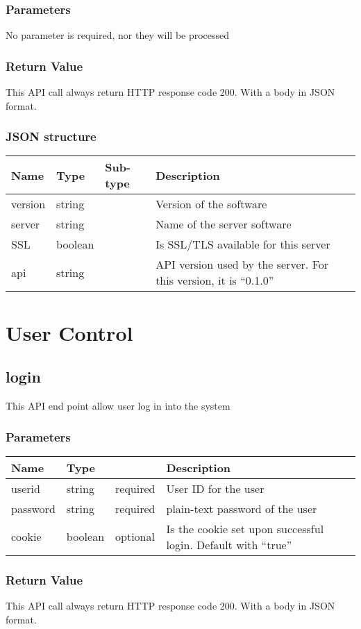 \documentclass[a4paper,12pt]{report}
\begin{document}
	\subsection{Parameters}
	No parameter is required, nor they will be processed
	\subsection{Return Value}
	This API call always return HTTP response code 200. With a body in JSON format.
	\subsection{JSON structure}
	\begin{tabular}{|l|l|l|p{10cm}|}
		\hline
		Name & Type & Sub-type & Description\\\hline
		version & string & & Version of the software\\\hline
		server & string & & Name of the server software\\\hline
		SSL & boolean & & Is SSL/TLS available for this server\\\hline
		api & string & & API version used by the server. For this version, it is ``0.1.0''\\\hline
	\end{tabular}
	\chapter{User Control}
	\section{login}
	This API end point allow user log in into the system
	\subsection{Parameters}
	\begin{tabular}{|l|ll|p{10cm}|}
		\hline
		Name & Type & & Description\\\hline
		userid & string & required & User ID for the user\\\hline
		password & string & required & plain-text password of the user\\\hline
		cookie & boolean & optional & 	Is the cookie set upon successful login.\newline
										Default with ``true''\\\hline
	\end{tabular}
	\subsection{Return Value}
	This API call always return HTTP response code 200. With a body in JSON format.
\end{document}
